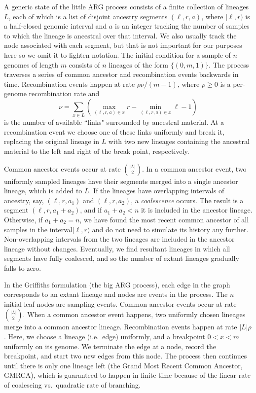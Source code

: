 \documentclass{article}
\begin{document}
A generic state of the little ARG process consists of a finite collection of lineages $L$,
each of which is a list of disjoint ancestry segments $(\ell, r, a)$, where
$[\ell, r)$ is a half-closed genomic interval and $a$ is an integer
tracking the number of samples to which the lineage is ancestral over that interval.
We also usually track the node associated with each segment, but
that is not important for our purposes here so we omit it to lighten notation.
The initial condition for a sample of $n$ genomes of length $m$ consists of $n$ lineages 
of the form $\{(0, m, 1)\}$. The process traverses a series of common ancestor and 
recombination events backwards in time.
Recombination events happen at rate $\rho \nu / (m - 1)$,
where $\rho \geq 0$ is a per-genome recombination rate and
 \[
 \nu = \sum_{x \in L}\left( \max_{(\ell, r, a) \in x}r
     - \min_{(\ell, r, a) \in x}\ell - 1 \right)
 \]
 is the number of available ``links" surrounded by ancestral material.
 At a recombination event we choose one of these links uniformly and break it,
 replacing the original lineage in $L$ with two new lineages containing the ancestral material
 to the left and right of the break point, respectively.

Common ancestor events occur at rate $\binom{|L|}{2}$.
In a common ancestor event, two uniformly sampled lineages have their segments
merged into a single ancestor lineage, which is added to $L$.
If the lineages have overlapping intervals of ancestry,
say, $(\ell, r, a_1)$ and $(\ell, r, a_2)$, a
\emph{coalescence} occurs. The result is a segment
$(\ell, r, a_1 + a_2)$, and if $a_1 + a_2 < n$ it is included in the
ancestor lineage. Otherwise, if $a_1 + a_2 = n$, we have found
the most recent common ancestor of all samples in the interval$[\ell, r)$
and do not need to simulate its history any further.
Non-overlapping intervals from the two lineages are included
 in the ancestor lineage without changes. Eventually,
we find resultant lineages in which all segments have fully coalesced,
and so the number of extant lineages gradually falls to zero.

In the Griffiths formulation (the big ARG process), each edge in the graph corresponds to an extant
lineage and nodes are events in the process. The $n$ initial leaf nodes are
sampling events. Common ancestor events occur at rate $\binom{|L|}{2}$.
When a common ancestor event happens, two uniformly chosen lineages
merge into a common ancestor lineage.
Recombination events happen at rate $|L| \rho$. Here, we choose a lineage (i.e.\ edge) uniformly,
and a breakpoint $0 < x < m$ uniformly on its genome. We terminate the edge at a
node, record the breakpoint, and start two new edges from this node. The process
then continues until there is only one lineage left (the Grand Most Recent
Common Ancestor, GMRCA), which is guaranteed to
happen in finite time because of the linear rate of coalescing vs.\ quadratic rate of branching.
\end{document}

